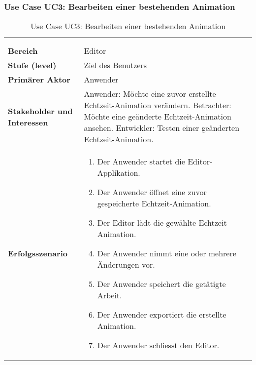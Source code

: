 
\subsubsection{Use Case UC3: Bearbeiten einer bestehenden Animation}
\label{ssubsec:requirements:use-cases:uc3}

\begin{longtabu}{p{0.5\textwidth}p{0.5\textwidth}}
    \centering\\
    \caption{Use Case UC3: Bearbeiten einer bestehenden
        Animation}\label{table:uc3-edit-demo}\\
    \toprule
        \textbf{Bereich} &
        Editor \\
    \cmidrule(r){1-1}\cmidrule(lr){2-2}
        \textbf{Stufe (level)} &
        Ziel des Benutzers \\
    \cmidrule(r){1-1}\cmidrule(lr){2-2}
        \textbf{Primärer Aktor} &
        Anwender \\
    \cmidrule(r){1-1}\cmidrule(lr){2-2}
        \textbf{Stakeholder und Interessen} &
        Anwender: Möchte eine zuvor erstellte Echtzeit-Animation verändern. \newline
        Betrachter: Möchte eine geänderte Echtzeit-Animation ansehen. \newline
        Entwickler: Testen einer geänderten Echtzeit-Animation. \\
    \cmidrule(r){1-1}\cmidrule(lr){2-2}
        \textbf{Erfolgsszenario} &
        \begin{enumerate}
            \item{Der Anwender startet die Editor-Applikation.}
            \item{Der Anwender öffnet eine zuvor gespeicherte
                    Echtzeit-Animation.}
            \item{Der Editor lädt die gewählte Echtzeit-Animation.}
            \item{Der Anwender nimmt eine oder mehrere Änderungen vor.}
            \item{Der Anwender speichert die getätigte Arbeit.}
            \item{Der Anwender exportiert die erstellte Animation.}
            \item{Der Anwender schliesst den Editor.}
        \end{enumerate} \\

\end{longtabu}
